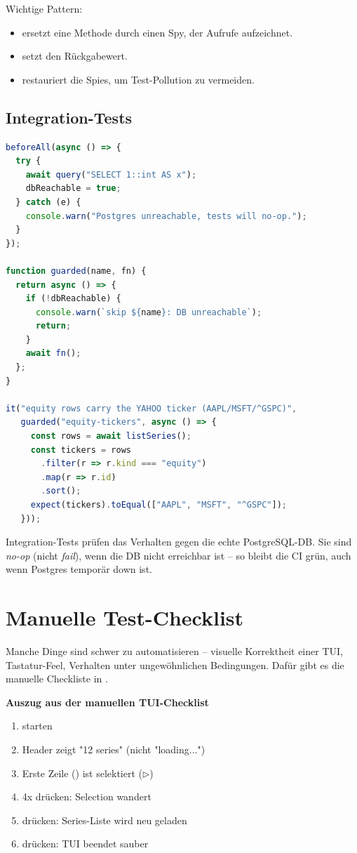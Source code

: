 Wichtige Pattern:

\begin{itemize}
  \item {} ersetzt eine Methode durch einen Spy, der
        Aufrufe aufzeichnet.
  \item {} setzt den Rückgabewert.
  \item {} restauriert die Spies, um Test-Pollution zu
        vermeiden.
\end{itemize}

\subsection{Integration-Tests}

\begin{lstlisting}[language=typescript, caption={Integration-Test mit echtem Postgres}]
beforeAll(async () => {
  try {
    await query("SELECT 1::int AS x");
    dbReachable = true;
  } catch (e) {
    console.warn("Postgres unreachable, tests will no-op.");
  }
});

function guarded(name, fn) {
  return async () => {
    if (!dbReachable) {
      console.warn(`skip ${name}: DB unreachable`);
      return;
    }
    await fn();
  };
}

it("equity rows carry the YAHOO ticker (AAPL/MSFT/^GSPC)",
   guarded("equity-tickers", async () => {
     const rows = await listSeries();
     const tickers = rows
       .filter(r => r.kind === "equity")
       .map(r => r.id)
       .sort();
     expect(tickers).toEqual(["AAPL", "MSFT", "^GSPC"]);
   }));
\end{lstlisting}

Integration-Tests prüfen das Verhalten gegen die echte
PostgreSQL-DB. Sie sind \emph{no-op} (nicht \emph{fail}), wenn
die DB nicht erreichbar ist -- so bleibt die CI grün, auch wenn
Postgres temporär down ist.

\section{Manuelle Test-Checklist}

Manche Dinge sind schwer zu automatisieren -- visuelle Korrektheit
einer TUI, Tastatur-Feel, Verhalten unter ungewöhnlichen
Bedingungen. Dafür gibt es die manuelle Checkliste in
.

\begin{beispiel}
\textbf{Auszug aus der manuellen TUI-Checklist}
  \begin{enumerate}
    \item {} starten
    \item Header zeigt "12 series" (nicht "loading...")
    \item Erste Zeile () ist selektiert ($\triangleright$)
    \item \code{$\downarrow$} 4x drücken: Selection wandert
    \item {} drücken: Series-Liste wird neu geladen
    \item {} drücken: TUI beendet sauber
  \end{enumerate}
\end{beispiel}

